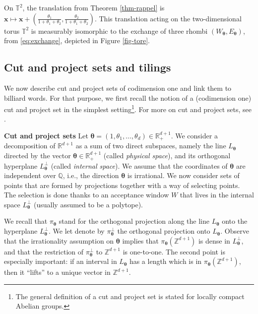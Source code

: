\documentclass{article}
\theoremstyle{definition}
\newcommand{\R}{\mathbb{R}}
\newcommand{\btheta}{\boldsymbol{\theta}}
\begin{document}
On ${\mathbb T}^2$, the translation from Theorem  \ref{thm-rappel}  is  $ {\mathbf x} \mapsto   {\mathbf x} + (\frac{\theta_1}{1+\theta_1+\theta_2}, \frac{\theta_2}{1+\theta_1+\theta_2})$. 
 This translation    acting on the  two-dimensional  torus $\mathbb T^2$ is  measurably isomorphic  to  the  exchange of three rhombi $(W_{\btheta}, E_{\btheta})$, from \cref{eq:exchange}, depicted in  Figure \ref{fig-tore}. %







\subsection{Cut and project sets and tilings }\label{sec:CP}


We now describe cut and project sets of codimension one and link them to billiard words.
For that purpose, we  first recall the notion of  a (codimension one) cut and project set in the simplest setting\footnote{The general definition  of a cut and  project set   is stated   for    locally compact Abelian groups.}. For more  on cut and project sets, see \cite{CRM:2000,BaakeGrimm,MAP:15}. 

\medskip 
{\bf Cut and project sets}  Let $\btheta=(1,\theta_1, \ldots, \theta_d) \in \R^{d+1}_+$.  We consider  a decomposition of $\R^{d+1}$ as a sum of two direct subspaces,
namely   the line  $L_{\btheta}$ directed by the  vector $\btheta \in \R^{d+1}_+$ (called {\em physical space}), and its orthogonal hyperplane $ L_{\btheta}^\perp$ (called {\em internal space}). 
We assume  that  the coordinates of  $\btheta$ are independent over $\mathbb Q$,  i.e., the direction  $\btheta$ is irrational.
We now consider  sets  of points  that  are  formed by projections together with a way of selecting points. 
The selection is done thanks to an acceptance window $W$ that lives in the internal space $L_{\btheta}^\perp$
  (usually assumed to be a polytope). 
  
 We recall that   $\pi_{\btheta}$ stand for  the orthogonal projection  along  the line  $L_{\btheta}$ onto  the  hyperplane  $L_{\btheta}^\perp$.   We let  denote by  $\pi_{\btheta}^\perp$ the orthogonal projection onto  $L_{\btheta}$.
Observe that the irrationality  assumption on   $\btheta$  implies  that 
$\pi _{\btheta}(\mathbb Z^{d+1})$ is dense in  $L_{\btheta}^\perp$, and that
  the restriction of $\pi_{\btheta}^{\perp}$ to $\mathbb Z^{d+1}$ is one-to-one.
  The second point is especially important: if an interval in $L_{\btheta}$ has a length which is in $\pi_{\btheta} (\mathbb Z^{d+1})$, then it ``lifts'' to a unique  vector in $\mathbb Z^{d+1}$.
  
\end{document}
